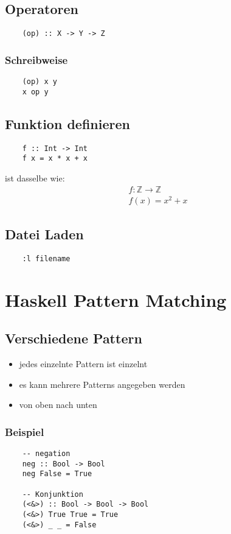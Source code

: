 \documentclass[a4paper]{article}
\begin{document}
\subsection{Operatoren}
\begin{verbatim}
    (op) :: X -> Y -> Z
\end{verbatim}
\subsubsection{Schreibweise}
\begin{verbatim}
    (op) x y 
    x op y 
\end{verbatim}
\subsection{Funktion definieren}
\begin{verbatim}
    f :: Int -> Int
    f x = x * x + x
\end{verbatim}
ist dasselbe wie:
\begin{align*}
    f : \mathbb{Z} \rightarrow \mathbb{Z} \\
    f(x) = x^2 + x
\end{align*}
\subsection{Datei Laden}
\begin{verbatim}
    :l filename
\end{verbatim}

\section{Haskell Pattern Matching}
\subsection{Verschiedene Pattern}
\begin{itemize}
    \item jedes einzelnte Pattern ist einzelnt
    \item es kann mehrere Patterns angegeben werden
    \item von oben nach unten
\end{itemize}
\subsubsection{Beispiel}
\begin{verbatim}
    -- negation
    neg :: Bool -> Bool
    neg False = True

    -- Konjunktion
    (<&>) :: Bool -> Bool -> Bool
    (<&>) True True = True
    (<&>) _ _ = False
\end{verbatim}
\end{document}
